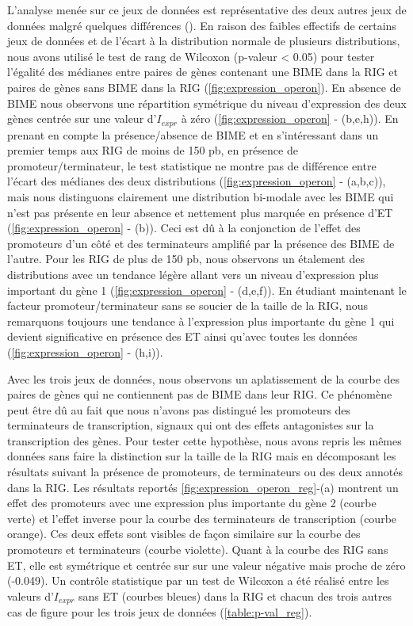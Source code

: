 \documentclass[12pt,a4paper]{report}
\begin{document}
\begin{onehalfspace}
L'analyse menée sur ce jeux de données est représentative des deux autres jeux de données malgré quelques différences (). En raison des faibles effectifs de certains jeux de données et de l’écart à la distribution normale de plusieurs distributions, nous avons utilisé le test de rang de Wilcoxon (p-valeur < 0.05) pour tester l’égalité des médianes entre paires de gènes contenant une BIME dans la RIG et paires de gènes sans BIME dans la RIG (\autoref{fig:expression_operon}).
En absence de BIME nous observons une répartition symétrique du niveau d'expression des deux gènes centrée sur une valeur d'$I_{expr}$ à zéro (\autoref{fig:expression_operon} - (b,e,h)).
En prenant en compte la présence/absence de BIME et en s'intéressant dans un premier temps aux RIG de moins de 150 pb, en présence de promoteur/terminateur, le test statistique ne montre pas de différence entre l'écart des médianes des deux distributions (\autoref{fig:expression_operon} - (a,b,c)), mais nous distinguons clairement une distribution bi-modale avec les BIME qui n'est pas présente en leur absence et nettement plus marquée en présence d'ET (\autoref{fig:expression_operon} - (b)). Ceci est dû à la conjonction de l'effet des promoteurs d'un côté et des terminateurs amplifié par la présence des BIME de l'autre.
Pour les RIG de plus de 150 pb, nous observons un étalement des distributions avec un tendance légère allant vers un niveau d'expression plus important du gène 1 (\autoref{fig:expression_operon} - (d,e,f)).
En étudiant maintenant le facteur promoteur/terminateur sans se soucier de la taille de la RIG, nous remarquons toujours une tendance à l'expression plus importante du gène 1 qui devient significative en présence des ET ainsi qu'avec toutes les données (\autoref{fig:expression_operon} - (h,i)). 

Avec les trois jeux de données, nous observons un aplatissement de la courbe des paires de gènes qui ne contiennent pas de BIME dans leur RIG. Ce phénomène peut être dû au fait que nous n’avons pas distingué les promoteurs des terminateurs de transcription, signaux qui ont des effets antagonistes sur la transcription des gènes. Pour tester cette hypothèse, nous avons repris les mêmes données sans faire la distinction sur la taille de la RIG mais en décomposant les résultats suivant la présence de promoteurs, de terminateurs ou des deux annotés dans la RIG. Les résultats reportés \autoref{fig:expression_operon_reg}-(a) montrent un effet des promoteurs avec une expression plus importante du gène 2 (courbe verte) et l'effet inverse pour la courbe des terminateurs de transcription (courbe orange). Ces deux effets sont visibles de façon similaire sur la courbe des promoteurs et terminateurs (courbe violette). Quant à la courbe des RIG sans ET, elle est symétrique et centrée sur sur une valeur négative mais proche de zéro (-0.049). Un contrôle statistique par un test de Wilcoxon a été réalisé entre les valeurs d'$I_{expr}$ sans ET (courbes bleues) dans la RIG et chacun des trois autres cas de figure pour les trois jeux de données (\autoref{table:p-val_reg}). 


\end{onehalfspace}
\end{document}
